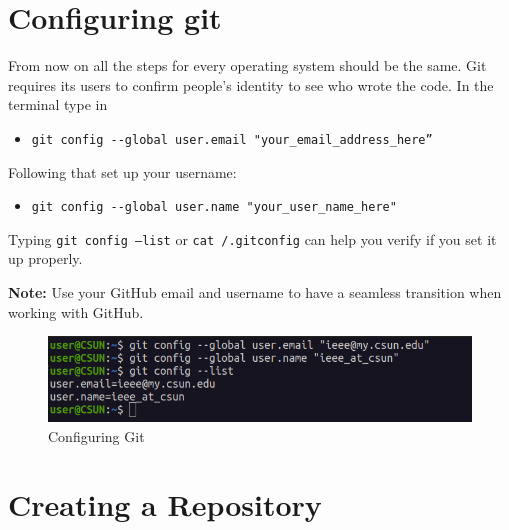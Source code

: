 \documentclass[12pt, a4paper]{article}
\begin{document}
\section{Configuring git}

From now on all the steps for every operating system should be the same.
Git requires its users to confirm people's identity to see who wrote the code. In the terminal type in
\begin{itemize}
\item\verb+git config --global user.email "your_email_address_here”+
\end{itemize}
Following that set up your username:
\begin{itemize}
\item \verb+git config --global user.name "your_user_name_here"+
\end{itemize}

Typing \texttt{git config --list} or \texttt{cat \tilda/.gitconfig} can help you verify if you set it up properly.\\\par
\textbf{Note:} Use your GitHub email and username to have a seamless transition when working with GitHub.

\begin{figure}[H]
\centering
\includegraphics[scale=0.5]{../images/workshop-I/git-config.png}
\caption{Configuring Git}
\end{figure}
\section{Creating a Repository}
\end{document}
